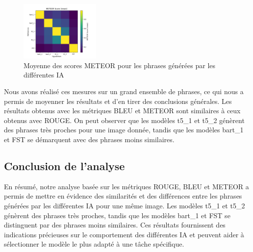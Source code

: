 \documentclass[conference]{IEEEtran}
\begin{document}
\begin{figure}[htbp!]
\centering
\includegraphics[width=0.35\textwidth]{images/meteor_score_mean_1000.png}
\caption{Moyenne des scores METEOR pour les phrases générées par les différentes IA}
\label{fig}
\end{figure}

Nous avons réalisé ces mesures sur un grand ensemble de phrases, ce qui nous a permis de moyenner les résultats et d'en tirer des conclusions générales. Les résultats obtenus avec les métriques BLEU et METEOR sont similaires à ceux obtenus avec ROUGE. On peut observer que les modèles t5\_1 et t5\_2 génèrent des phrases très proches pour une image donnée, tandis que les modèles bart\_1 et FST se démarquent avec des phrases moins similaires.

\subsection{Conclusion de l'analyse}

En résumé, notre analyse basée sur les métriques ROUGE, BLEU et METEOR a permis de mettre en évidence des similarités et des différences entre les phrases générées par les différentes IA pour une même image. Les modèles t5\_1 et t5\_2 génèrent des phrases très proches, tandis que les modèles bart\_1 et FST se distinguent par des phrases moins similaires. Ces résultats fournissent des indications précieuses sur le comportement des différentes IA et peuvent aider à sélectionner le modèle le plus adapté à une tâche spécifique.

%
\end{document}
